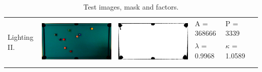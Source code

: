\begin{table}[H]
\begin{tabular}{|l|c|c|l|l|c|}
\multirow{4}{*}{Lighting II.} & \multirow{4}{*}{\includegraphics[scale=0.08]{../images/1/8_img.png}} & \multirow{4}{*}{\includegraphics[scale=0.08]{../images/1/8_mask.png}} & A = 368666 & P = 3339 & \multirow{4}{*}{}\\ 
& & & $\lambda$ = 0.9968 & $\kappa$ = 1.0589 & \\
&&&&&\\
&&&&&\\
\hline


\end{tabular} 
  \caption{Test images, mask and factors.}
  \label{fig:occtab1}
\end{table}

